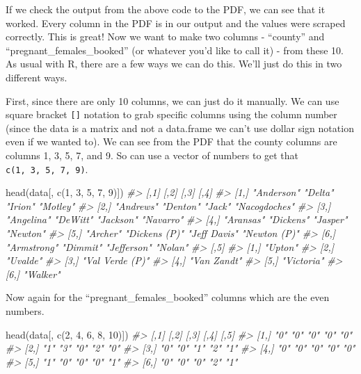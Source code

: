 \documentclass[
]{krantz}
\makeatletter
\newenvironment{Shaded}{\begin{snugshade}}{\end{snugshade}}
\newcommand{\CommentTok}[1]{\textcolor[rgb]{0.37,0.37,0.37}{\textit{#1}}}
\newcommand{\DecValTok}[1]{\textcolor[rgb]{0.06,0.06,0.06}{#1}}
\newcommand{\FunctionTok}[1]{\textcolor[rgb]{0,0,0}{#1}}
\newcommand{\NormalTok}[1]{#1}
\newenvironment{kframe}{%
\medskip{}
\setlength{\fboxsep}{.8em}
 \def\at@end@of@kframe{}%
 \ifinner\ifhmode%
  \def\at@end@of@kframe{\end{minipage}}%
  \begin{minipage}{\columnwidth}%
 \fi\fi%
 \def\FrameCommand##1{\hskip\@totalleftmargin \hskip-\fboxsep
 \colorbox{shadecolor}{##1}\hskip-\fboxsep
     \hskip-\linewidth \hskip-\@totalleftmargin \hskip\columnwidth}%
 \MakeFramed {\advance\hsize-\width
   \@totalleftmargin\z@ \linewidth\hsize
   \@setminipage}}%
 {\par\unskip\endMakeFramed%
 \at@end@of@kframe}
\renewenvironment{Shaded}{\begin{kframe}}{\end{kframe}}
\makeatother
\begin{document}
If we check the output from the above code to the PDF, we
can see that it worked. Every column in the PDF is in our
output and the values were scraped correctly. This is great!
Now we want to make two columns - ``county'' and
``pregnant\_females\_booked'' (or whatever you'd like to
call it) - from these 10. As usual with R, there are a few
ways we can do this. We'll just do this in two different
ways.

First, since there are only 10 columns, we can just do it
manually. We can use square bracket \texttt{{[}{]}} notation
to grab specific columns using the column number (since the
data is a matrix and not a data.frame we can't use dollar
sign notation even if we wanted to). We can see from the PDF
that the county columns are columns 1, 3, 5, 7, and 9. So
can use a vector of numbers to get that
\texttt{c(1,\ 3,\ 5,\ 7,\ 9)}.

\begin{Shaded}
\begin{Highlighting}[]
\FunctionTok{head}\NormalTok{(data[, }\FunctionTok{c}\NormalTok{(}\DecValTok{1}\NormalTok{, }\DecValTok{3}\NormalTok{, }\DecValTok{5}\NormalTok{, }\DecValTok{7}\NormalTok{, }\DecValTok{9}\NormalTok{)])}
\CommentTok{\#\textgreater{}      [,1]        [,2]          [,3]         [,4]         }
\CommentTok{\#\textgreater{} [1,] "Anderson"  "Delta"       "Irion"      "Motley"     }
\CommentTok{\#\textgreater{} [2,] "Andrews"   "Denton"      "Jack"       "Nacogdoches"}
\CommentTok{\#\textgreater{} [3,] "Angelina"  "DeWitt"      "Jackson"    "Navarro"    }
\CommentTok{\#\textgreater{} [4,] "Aransas"   "Dickens"     "Jasper"     "Newton"     }
\CommentTok{\#\textgreater{} [5,] "Archer"    "Dickens (P)" "Jeff Davis" "Newton (P)" }
\CommentTok{\#\textgreater{} [6,] "Armstrong" "Dimmit"      "Jefferson"  "Nolan"      }
\CommentTok{\#\textgreater{}      [,5]           }
\CommentTok{\#\textgreater{} [1,] "Upton"        }
\CommentTok{\#\textgreater{} [2,] "Uvalde"       }
\CommentTok{\#\textgreater{} [3,] "Val Verde (P)"}
\CommentTok{\#\textgreater{} [4,] "Van Zandt"    }
\CommentTok{\#\textgreater{} [5,] "Victoria"     }
\CommentTok{\#\textgreater{} [6,] "Walker"}
\end{Highlighting}
\end{Shaded}

Now again for the ``pregnant\_females\_booked'' columns
which are the even numbers.

\begin{Shaded}
\begin{Highlighting}[]
\FunctionTok{head}\NormalTok{(data[, }\FunctionTok{c}\NormalTok{(}\DecValTok{2}\NormalTok{, }\DecValTok{4}\NormalTok{, }\DecValTok{6}\NormalTok{, }\DecValTok{8}\NormalTok{, }\DecValTok{10}\NormalTok{)])}
\CommentTok{\#\textgreater{}      [,1] [,2] [,3] [,4] [,5]}
\CommentTok{\#\textgreater{} [1,] "0"  "0"  "0"  "0"  "0" }
\CommentTok{\#\textgreater{} [2,] "1"  "3"  "0"  "2"  "0" }
\CommentTok{\#\textgreater{} [3,] "0"  "0"  "1"  "2"  "1" }
\CommentTok{\#\textgreater{} [4,] "0"  "0"  "0"  "0"  "0" }
\CommentTok{\#\textgreater{} [5,] "1"  "0"  "0"  "0"  "1" }
\CommentTok{\#\textgreater{} [6,] "0"  "0"  "0"  "2"  "1"}
\end{Highlighting}
\end{Shaded}
\end{document}
